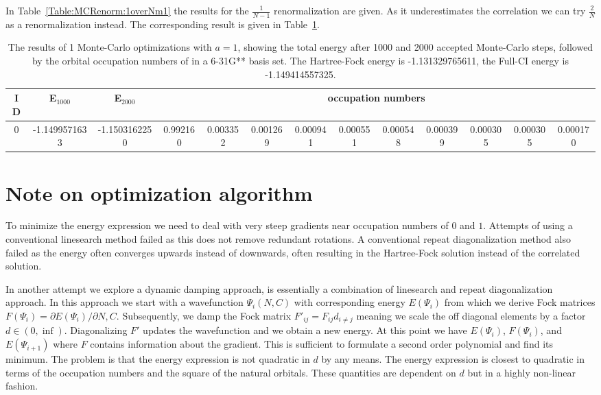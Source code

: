 \documentclass[pra,nofootinbib]{revtex4-1}
\newcommand{\dlabel}[1]{\text{#1}\label{#1}}
\begin{document}
In Table~\ref{Table:MCRenorm:1overNm1} the results for the $\frac{1}{N-1}$ renormalization are given. As it
underestimates the correlation we can try $\frac{2}{N}$ as a renormalization instead. The corresponding 
result is given in Table~\ref{Table:MCRenorm:2overN}.

\begin{table}
\begin{tabular}{|c|c|c|cccccccccc|}
\hline\hline 
ID & E$_{1000}$ & E$_{2000}$ & \multicolumn{10}{c}{occupation numbers} \\
\hline 
0 & -1.1499571633 & -1.1503162250 & 0.992160 & 0.003352 & 0.001269 & 0.000941 & 0.000551 & 0.000548 & 0.000399 & 0.000305 & 0.000305 & 0.000170 \\
\hline\hline
\end{tabular}
\dlabel{Table:MCRenorm:2overN}
\caption{The results of 1 Monte-Carlo optimizations with $a=1$, showing the total energy after 1000 and 2000 
accepted Monte-Carlo steps, followed by the orbital occupation numbers of  in a 6-31G** basis
set. The Hartree-Fock energy is -1.131329765611, the Full-CI energy is -1.149414557325.}
\end{table}

\section{Note on optimization algorithm}

To minimize the energy expression we need to deal with very steep gradients near occupation 
numbers of $0$ and $1$. Attempts of using a conventional linesearch method failed as this
does not remove redundant rotations. A conventional repeat diagonalization method also
failed as the energy often converges upwards instead of downwards, often resulting in
the Hartree-Fock solution instead of the correlated solution. 

In another attempt we explore a dynamic damping approach, is essentially a combination
of linesearch and repeat diagonalization approach. In this approach we start with a
wavefunction $\Psi_i(N,C)$ with corresponding energy $E(\Psi_i)$ from which we derive
Fock matrices $F(\Psi_i) = \partial E(\Psi_i)/\partial N,C$. Subsequently, we damp the
Fock matrix $F'_{ij} = F_{ij}d_{i\ne j}$ meaning we scale the off diagonal elements by
a factor $d \in (0,\inf)$. Diagonalizing $F'$ updates the wavefunction and we obtain
a new energy. At this point we have $E(\Psi_i)$, $F(\Psi_i)$, and $E(\Psi_{i+1})$ where
$F$ contains information about the gradient. This is sufficient to formulate a second
order polynomial and find its minimum. The problem is that the energy expression is
not quadratic in $d$ by any means. The energy expression is closest to quadratic in
terms of the occupation numbers and the square of the natural orbitals. These quantities
are dependent on $d$ but in a highly non-linear fashion.
\end{document}
